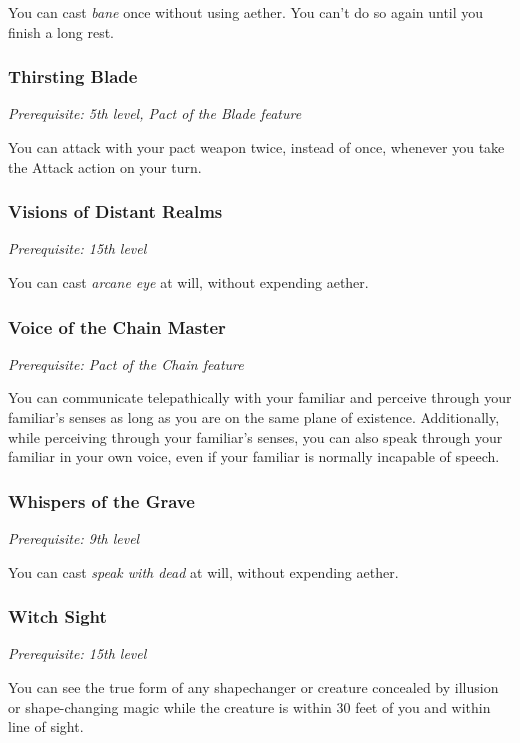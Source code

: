 You can cast \textit{bane} once without using aether. You can't do so again until you finish a long rest.

\subsubsection{Thirsting Blade}

\textit{Prerequisite: 5th level, Pact of the Blade feature}

You can attack with your pact weapon twice, instead of once, whenever you take the Attack action on your turn.

\subsubsection{Visions of Distant Realms}

\textit{Prerequisite: 15th level}

You can cast \textit{arcane eye} at will, without expending aether.

\subsubsection{Voice of the Chain Master}

\textit{Prerequisite: Pact of the Chain feature}

You can communicate telepathically with your familiar and perceive through your familiar's senses as long as you are on the same plane of existence. Additionally, while perceiving through your familiar's senses, you can also speak through your familiar in your own voice, even if your familiar is normally incapable of speech.

\subsubsection{Whispers of the Grave}

\textit{Prerequisite: 9th level}

You can cast \textit{speak with dead} at will, without expending aether.

\subsubsection{Witch Sight}

\textit{Prerequisite: 15th level}

You can see the true form of any shapechanger or creature concealed by illusion or shape-changing magic while the creature is within 30 feet of you and within line of sight.

